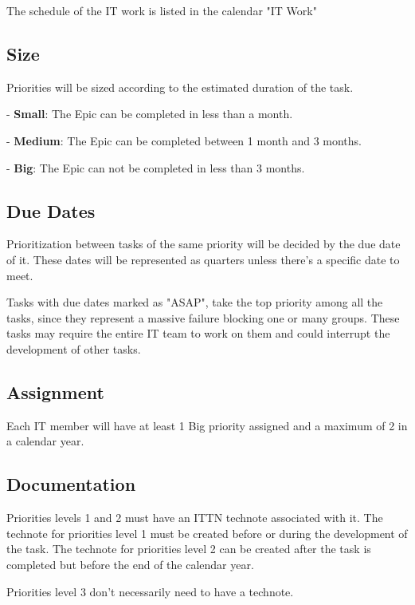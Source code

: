 The schedule of the IT work is listed in the calendar "IT Work"

\subsection{Size }

Priorities will be sized according to the estimated duration of the task.

  - {\bf Small}: The Epic can be completed in less than a month.

  - {\bf Medium}: The Epic can be completed between 1 month and 3 months.

  - {\bf Big}: The Epic can not be completed in less than 3 months.

\subsection{Due Dates }

Prioritization between tasks of the same priority will be decided by the due date of it. These dates will be represented as quarters unless there's a specific date to meet.

Tasks with due dates marked as "ASAP", take the top priority among all the tasks, since they represent a massive failure blocking one or many groups. These tasks may require the entire IT team to work on them and could interrupt the development of other tasks.

\subsection{Assignment }

Each IT member will have at least 1 Big priority assigned and a maximum of 2 in a calendar year.

\subsection{Documentation }

Priorities levels 1 and 2 must have an ITTN technote associated with it. The technote for priorities level 1 must be created before or during the development of the task. The technote for priorities level 2 can be created after the task is completed but before the end of the calendar year.

Priorities level 3 don't necessarily need to have a technote.
